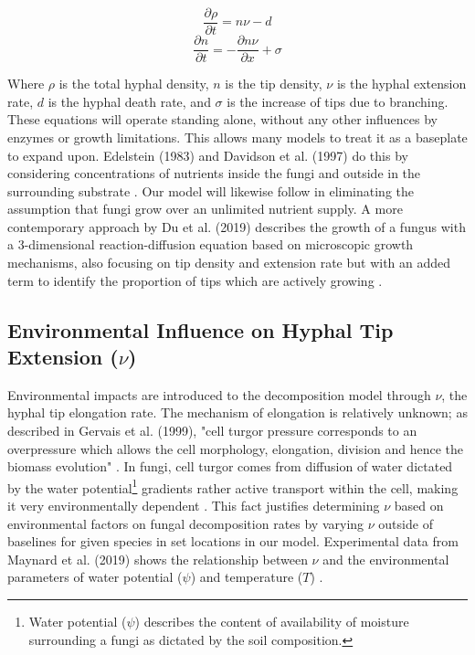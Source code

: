 \documentclass[12pt]{article}
\begin{document}
\begin{multicols}{2}
\begin{equation} \label{eq:1}
\frac{\partial \rho}{\partial t} = n\nu - d
\end{equation}
\begin{equation} \label{eq:2}
\frac{\partial n}{\partial t} = -\frac{\partial n\nu}{\partial x} + \sigma
\end{equation}

Where  $\rho$ is the total hyphal density, $n$ is the tip density, $\nu$ is the hyphal extension rate, $d$ is the hyphal death rate, and $\sigma$ is the increase of tips due to branching. These equations will operate standing alone, without any other influences by enzymes or growth limitations. This allows many models to treat it as a baseplate to expand upon. Edelstein (1983) and Davidson et al. (1997) do this by considering concentrations of nutrients inside the fungi and outside in the surrounding substrate \cite{Edelstein1983, Davidson2012}. Our model will likewise follow in eliminating the assumption that fungi grow over an unlimited nutrient supply. A more contemporary approach by Du et al. (2019) describes the growth of a fungus with a 3-dimensional reaction-diffusion equation based on microscopic growth mechanisms, also focusing on tip density and extension rate but with an added term to identify the proportion of tips which are actively growing \cite{Du2019}.

\subsection{Environmental Influence on Hyphal Tip Extension ($\nu$)}
Environmental impacts are introduced to the decomposition model through $\nu$, the hyphal tip elongation rate. The mechanism of elongation is relatively unknown; as described in Gervais et al. (1999), "cell turgor pressure corresponds to an overpressure which allows the cell morphology, elongation, division and hence the biomass evolution" \cite{Gervais1999, Steinberg2007}. In fungi, cell turgor comes from diffusion of water dictated by the water potential\footnote{Water potential ($\psi$) describes the content of availability of moisture surrounding a fungi as dictated by the soil composition.} gradients rather active transport within the cell, making it very environmentally dependent \cite{Gervais1999}. This fact justifies determining $\nu$ based on environmental factors on fungal decomposition rates by varying $\nu$ outside of baselines for given species in set locations in our model. Experimental data from Maynard et al. (2019) shows the relationship between $\nu$ and the environmental parameters of water potential ($\psi$) and temperature ($T$) \cite{Maynard2019}.


\end{multicols}
\end{document}
